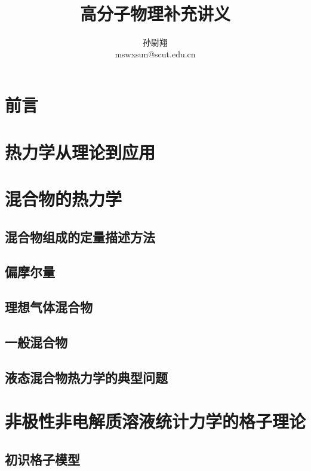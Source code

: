 \documentclass[
  zihao=5,
  linespread=1.3,
  a4paper,
  heading=true,
  twoside
]{ctexbook}
\title{高分子物理补充讲义}
\author{孙尉翔\\mswxsun@scut.edu.cn}
\theoremstyle{definition}
\theoremstyle{plain}
\begin{document}
\maketitle
\frontmatter
\pagestyle{fancy}
\chapter*{前言}\label{sec:preface}


\tableofcontents
\mainmatter
\chapter{热力学从理论到应用}\label{sec:I_thermodynamic_relations}


\chapter{混合物的热力学}\label{sec:II 混合物的热力学}
\section{混合物组成的定量描述方法}\label{sec:II.1 composition_measures}

\section{偏摩尔量}\label{sec:II.2 partial_molar_quantities}

\section{理想气体混合物}\label{sec:II.3 ideal_mixture.tex}

\section{一般混合物}\label{sec:II.4 real_mixture}

\section{液态混合物热力学的典型问题}\label{sec:II.5 typical_problems}


\chapter{非极性非电解质溶液统计力学的格子理论}

\section{初识格子模型}

\end{document}
